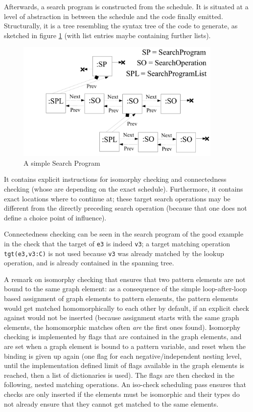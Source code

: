 Afterwards, a search program is constructed from the schedule. 
It is situated at a level of abstraction in between the schedule and the code finally emitted.
Structurally, it is a tree resembling the syntax tree of the code to generate, as sketched in figure \ref{figsearchprogram} (with list entries maybe containing further lists). 

\begin{figure}[htbp]
  \centering
  \includegraphics[width=0.9\textwidth]{fig/SearchProgram}
  \caption{A simple Search Program}
  \label{figsearchprogram}
\end{figure}

It contains explicit instructions for isomorphy checking and connectedness checking (whose are depending on the exact schedule).
Furthermore, it contains exact locations where to continue at; these target search operations may be different from the directly preceding search operation (because that one does not define a choice point of influence).

Connectedness checking can be seen in the search program of the good example in the check that the target of \texttt{e3} is indeed \texttt{v3};
a target matching operation \texttt{tgt(e3,v3:C)} is not used because \texttt{v3} was already matched by the lookup operation, and is already contained in the spanning tree.

A remark on isomorphy checking that ensures that two pattern elements are not bound to the same graph element:
as a consequence of the simple loop-after-loop based assignment of graph elements to pattern elements, the pattern elements would get matched homomorphically to each other by default, 
if an explicit check against would not be inserted (because assignment starts with the same graph elements, the homomorphic matches often \emph{are} the first ones found).
Isomorphy checking is implemented by flags that are contained in the graph elements, and are set when a graph element is bound to a pattern variable, and reset when the binding is given up again 
(one flag for each negative/independent nesting level, until the implementation defined limit of flags available in the graph elements is reached, then a list of dictionaries is used).
The flags are then checked in the following, nested matching operations. 
An iso-check scheduling pass ensures that checks are only inserted if the elements must be isomorphic and their types do not already ensure that they cannot get matched to the same elements.

